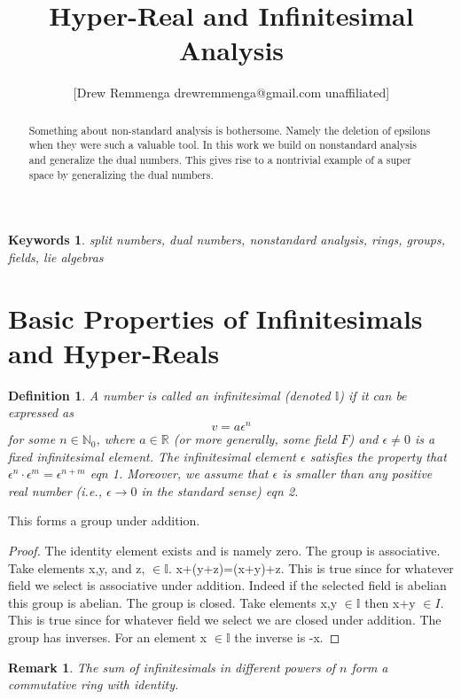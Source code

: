 \documentclass[10pt, oneside]{article}
\title{Hyper-Real and Infinitesimal Analysis}
\author{[Drew Remmenga drewremmenga@gmail.com unaffiliated]}
\newcommand{\I}{\mathbb{I}}
\newtheorem{defn}{Definition}
\newtheorem{rem}{Remark}
\newtheorem{keywords}{Keywords}
\begin{document}
\maketitle
\begin{abstract}
    Something about non-standard analysis is bothersome. Namely the deletion of epsilons when they were such a valuable tool. In this work we build on nonstandard analysis and generalize the dual numbers.
    This gives rise to a nontrivial example of a super space by generalizing the dual numbers. 
\end{abstract}
\begin{keywords}
    split numbers, dual numbers, nonstandard analysis, rings, groups, fields, lie algebras
\end{keywords}
\section{Basic Properties of Infinitesimals and Hyper-Reals}
\begin{defn}
    A number is called an infinitesimal \cite{robinson1966} (denoted \( \mathbb{I} \)) if it can be expressed as 
    \[
    v = a \epsilon^n
    \]
    for some \( n \in \mathbb{N}_0 \), where \( a \in \mathbb{R} \) (or more generally, some field \( F \)) and \( \epsilon \neq 0\) is a fixed infinitesimal element. The infinitesimal element \( \epsilon \) satisfies the property that \( \epsilon^n \cdot \epsilon^m = \epsilon^{n+m} \) eqn 1. Moreover, we assume that \( \epsilon \) is smaller than any positive real number (i.e., \( \epsilon \to 0 \) in the standard sense) eqn 2.
\end{defn}
This forms a group under addition. \cite{gallian2016}
\begin{proof}
    The identity element exists and is namely zero.
    The group is associative. Take elements x,y, and z, $\in \I$. x+(y+z)=(x+y)+z. This is true since for whatever field we select is associative under addition. Indeed if the selected field is abelian this group is abelian. 
    The group is closed. Take elements x,y $\in \I$ then x+y $\in I$. This is true since for whatever field we select we are closed under addition. 
    The group has inverses. For an element x $\in \I$ the inverse is -x.
\end{proof} 
\begin{rem}
    The sum of infinitesimals in different powers of $n$ form a commutative ring with identity. 
\end{rem}
\end{document}
